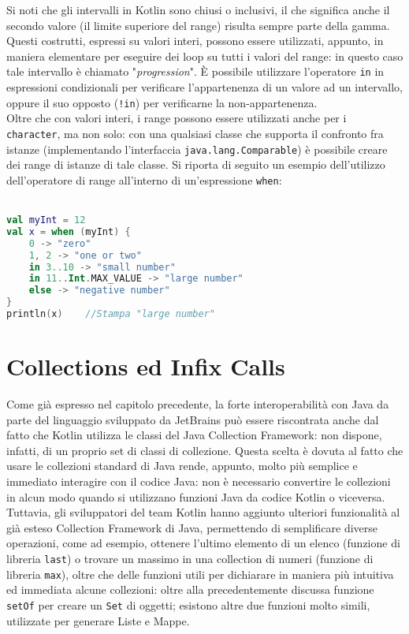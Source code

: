 Si noti che gli intervalli in Kotlin sono chiusi o inclusivi, il che significa anche il secondo valore (il limite superiore del range) risulta sempre parte della gamma. Questi costrutti, espressi su valori interi, possono essere utilizzati, appunto, in maniera elementare per eseguire dei loop su tutti i valori del range: in questo caso tale intervallo è chiamato "{\em progression}". È possibile utilizzare l'operatore \texttt{in} in espressioni condizionali per verificare l’appartenenza di un valore ad un intervallo, oppure il suo opposto (\texttt{!in}) per verificarne la non-appartenenza.\\
Oltre che con valori interi, i range possono essere utilizzati anche per i \texttt{character}, ma non solo: con una qualsiasi classe che supporta il confronto fra istanze (implementando l'interfaccia \texttt{java.lang.Comparable}) è possibile creare dei range di istanze di tale classe. Si riporta di seguito un esempio dell'utilizzo dell'operatore di range all'interno di un'espressione \texttt{when}:\\
\\

\begin{lstlisting}[caption={Operatore di range con valori interi all'interno di una espressione \texttt{when}}, captionpos=b, label={lst:exampleRangeWhen}, language=Kotlin]
val myInt = 12
val x = when (myInt) {
    0 -> "zero"
    1, 2 -> "one or two"
    in 3..10 -> "small number"
    in 11..Int.MAX_VALUE -> "large number"
    else -> "negative number"
}
println(x)    //Stampa "large number"
\end{lstlisting}

\section{Collections ed Infix Calls}
Come già espresso nel capitolo precedente, la forte interoperabilità con Java da parte del linguaggio sviluppato da JetBrains può essere riscontrata anche dal fatto che Kotlin utilizza le classi del Java Collection Framework: non dispone, infatti, di un proprio set di classi di collezione. Questa scelta è dovuta al fatto che usare le collezioni standard di Java rende, appunto, molto più semplice e immediato interagire con il codice Java: non è necessario convertire le collezioni in alcun modo quando si utilizzano funzioni Java da codice Kotlin o viceversa. Tuttavia, gli sviluppatori del team Kotlin hanno aggiunto ulteriori funzionalità al già esteso Collection Framework di Java, permettendo di semplificare diverse operazioni, come ad esempio, ottenere l'ultimo elemento di un elenco (funzione di libreria \texttt{last}) o trovare un massimo in una collection di numeri (funzione di libreria \texttt{max}), oltre che delle funzioni utili per dichiarare in maniera più intuitiva ed immediata alcune collezioni: oltre alla precedentemente discussa funzione \texttt{setOf} per creare un \texttt{Set} di oggetti; esistono altre due funzioni molto simili, utilizzate per generare Liste e Mappe.\\


